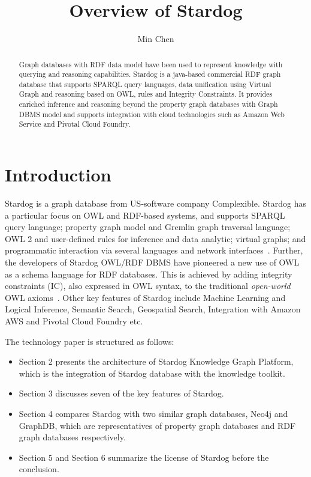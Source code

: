 \title{Overview of Stardog}


\author{Min Chen}


\begin{abstract}
Graph databases with RDF data model have been used to represent 
knowledge with querying and reasoning capabilities. Stardog is a java-based 
commercial RDF graph database that supports SPARQL query languages, 
data unification using Virtual Graph and reasoning based on OWL, rules and 
Integrity Constraints. It provides enriched inference and reasoning beyond 
the property graph databases with Graph DBMS model and supports 
integration with cloud technologies such as Amazon Web Service and Pivotal 
Cloud Foundry.

\end{abstract}



\maketitle


\section{Introduction}

Stardog is a graph database from US-software company
Complexible. Stardog has a particular focus on OWL and RDF-based
systems, and supports SPARQL query language; property graph model and 
Gremlin graph traversal language; OWL 2 and user-defined rules for 
inference and data analytic; virtual graphs; and
programmatic interaction via several languages and network
interfaces~\cite{hid-sp18-405-www-stardog-docs}. Further, the
developers of Stardog OWL/RDF DBMS have pioneered a new use of OWL as
a schema language for RDF databases. This is achieved by adding
integrity constraints (IC), also expressed in OWL syntax, to the traditional 
\textit{open-world} OWL 
axioms~\cite{hid-sp18-405-cer2012graphical-stardog}. Other key
features of Stardog include Machine Learning and Logical Inference,
Semantic Search, Geospatial Search, Integration with Amazon AWS and 
Pivotal Cloud Foundry etc.\ 

The technology paper is structured as follows:
\begin{itemize}
	\item Section 2 presents the architecture of Stardog Knowledge Graph 
	Platform, which is the integration of Stardog database with the knowledge 
	toolkit.
	\item Section 3 discusses seven of the key features of Stardog.
	\item Section 4 compares Stardog with two similar graph databases, Neo4j 
	and GraphDB, which are representatives of property graph databases and 
	RDF graph databases respectively.
	\item Section 5 and Section 6 summarize the license of Stardog before the 
	conclusion.
\end{itemize}

